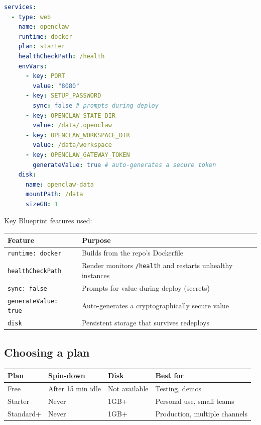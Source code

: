 \begin{lstlisting}[language=yaml]
services:
  - type: web
    name: openclaw
    runtime: docker
    plan: starter
    healthCheckPath: /health
    envVars:
      - key: PORT
        value: "8080"
      - key: SETUP_PASSWORD
        sync: false # prompts during deploy
      - key: OPENCLAW_STATE_DIR
        value: /data/.openclaw
      - key: OPENCLAW_WORKSPACE_DIR
        value: /data/workspace
      - key: OPENCLAW_GATEWAY_TOKEN
        generateValue: true # auto-generates a secure token
    disk:
      name: openclaw-data
      mountPath: /data
      sizeGB: 1
\end{lstlisting}


Key Blueprint features used:


\begin{table}[h]
\centering
\small
\begin{tabular}{|l|l|}
\hline
Feature & Purpose \\
\hline
\texttt{runtime: docker} & Builds from the repo's Dockerfile \\
\hline
\texttt{healthCheckPath} & Render monitors \texttt{/health} and restarts unhealthy instances \\
\hline
\texttt{sync: false} & Prompts for value during deploy (secrets) \\
\hline
\texttt{generateValue: true} & Auto-generates a cryptographically secure value \\
\hline
\texttt{disk} & Persistent storage that survives redeploys \\
\hline
\end{tabular}
\end{table}



\subsection{Choosing a plan}



\begin{table}[h]
\centering
\small
\begin{tabular}{|l|l|l|l|}
\hline
Plan & Spin-down & Disk & Best for \\
\hline
Free & After 15 min idle & Not available & Testing, demos \\
\hline
Starter & Never & 1GB+ & Personal use, small teams \\
\hline
Standard+ & Never & 1GB+ & Production, multiple channels \\
\hline
\end{tabular}
\end{table}



